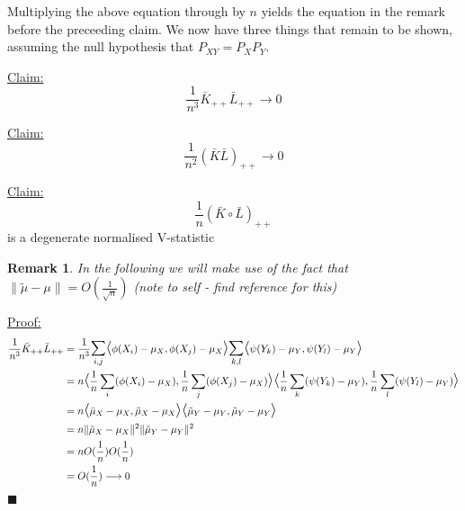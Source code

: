 \documentclass{article}
\newtheorem*{remark}{Remark}
\newenvironment{claim}[1]{\par\noindent\underline{Claim:}\space#1}{}
\newenvironment{claimproof}[1]{\par\noindent\underline{Proof:}\space#1}{\hfill $\blacksquare$}
\begin{document}
Multiplying the above equation through by $n$ yields the equation in the remark before the preceeding claim. We now have three things that remain to be shown, assuming the null hypothesis that $P_{XY}=P_XP_Y$.

\begin{claim}[1]
\[\frac{1}{n^3}\bar{K}_{++}\bar{L}_{++} \longrightarrow 0\]
\end{claim}

\begin{claim}[2]
\[\frac{1}{n^2}(\bar{K}\bar{L})_{++} \longrightarrow 0\]
\end{claim}


\begin{claim}[3]
\[\frac{1}{n}(\bar{K}\circ \bar{L})_{++}\]
is a degenerate normalised V-statistic
\end{claim}

\begin{remark}
In the following we will make use of the fact that $\|\tilde{\mu} - \mu\| = O(\frac{1}{\sqrt{n}})$ (note to self - find reference for this)
\end{remark}

\begin{claimproof}[1]
\begin{align*}
 \frac{1}{n^3}\bar{K}_{++}\bar{L}_{++} & =  \frac{1}{n^3}\mathlarger{\mathlarger{\sum}}_{i,j}\mathlarger{\mathlarger{\langle}} \phi(X_i) - \mu_X , \phi(X_j) - \mu_X \mathlarger{\mathlarger{\rangle}} \mathlarger{\mathlarger{\sum}}_{k,l}\mathlarger{\mathlarger{\langle}} \psi(Y_k) - \mu_Y , \psi(Y_l) - \mu_Y \mathlarger{\mathlarger{\rangle}} \\ &
 = n\mathlarger{\mathlarger{\langle}} \frac{1}{n}\sum_i(\phi(X_i) - \mu_X) , \frac{1}{n}\sum_j(\phi(X_j) - \mu_X) \mathlarger{\mathlarger{\rangle}} \mathlarger{\mathlarger{\langle}} \frac{1}{n}\sum_k(\psi(Y_k) - \mu_Y) , \frac{1}{n}\sum_l(\psi(Y_l) - \mu_Y) \mathlarger{\mathlarger{\rangle}}\\&
 = n \mathlarger{\mathlarger{\langle}} \bar{\mu}_X - \mu_X , \tilde{\mu}_X - \mu_X \mathlarger{\mathlarger{\rangle}} \mathlarger{\mathlarger{\langle}} \tilde{\mu}_Y - \mu_Y , \tilde{\mu}_Y - \mu_Y \mathlarger{\mathlarger{\rangle}} \\ &
= n\|\tilde{\mu}_X - \mu_X\|^2 \|\tilde{\mu}_Y - \mu_Y\|^2\\ &= nO(\frac{1}{n})O(\frac{1}{n}) \\&= O(\frac{1}{n}) \longrightarrow 0
\end{align*}
\end{claimproof}
\end{document}
